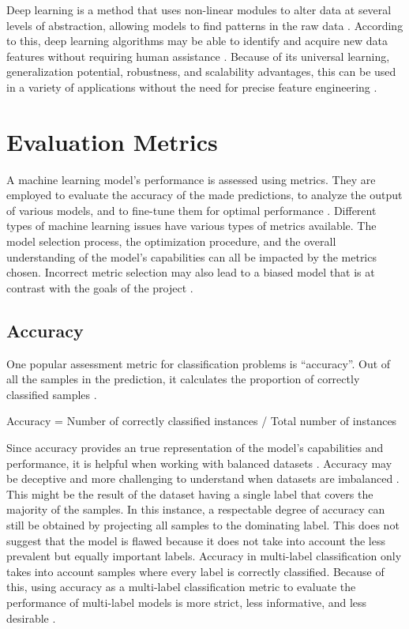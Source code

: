 Deep learning is a method that uses non-linear modules to alter data at several levels of abstraction, allowing models to find patterns in the raw data \citep{helland_tackling_2023}. According to this, deep learning algorithms may be able to identify and acquire new data features without requiring human assistance \citep{helland_tackling_2023}. Because of its universal learning, generalization potential, robustness, and scalability advantages, this can be used in a variety of applications without the need for precise feature engineering \citep{helland_tackling_2023}.

\section{Evaluation Metrics}

A machine learning model's performance is assessed using metrics. They are employed to evaluate the accuracy of the made predictions, to analyze the output of various models, and to fine-tune them for optimal performance \citep{helland_tackling_2023}. Different types of machine learning issues have various types of metrics available. The model selection process, the optimization procedure, and the overall understanding of the model's capabilities can all be impacted by the metrics chosen. Incorrect metric selection may also lead to a biased model that is at contrast with the goals of the project \citep{helland_tackling_2023}.

\subsection{Accuracy}

One popular assessment metric for classification problems is “accuracy”. Out of all the samples in the prediction, it calculates the proportion of correctly classified samples \citep{helland_tackling_2023}. 

Accuracy = Number of correctly classified instances / Total number of instances

Since accuracy provides an true representation of the model's capabilities and performance, it is helpful when working with balanced datasets \citep{helland_tackling_2023}. Accuracy may be deceptive and more challenging to understand when datasets are imbalanced \citep{helland_tackling_2023}. This might be the result of the dataset having a single label that covers the majority of the samples. In this instance, a respectable degree of accuracy can still be obtained by projecting all samples to the dominating label. This does not suggest that the model is flawed because it does not take into account the less prevalent but equally important labels. Accuracy in multi-label classification only takes into account samples where every label is correctly classified. Because of this, using accuracy as a multi-label classification metric to evaluate the performance of multi-label models is more strict, less informative, and less desirable \citep{helland_tackling_2023}.